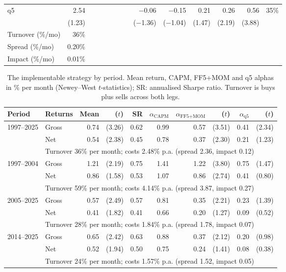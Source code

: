 \documentclass[12pt,a4paper]{article}
\begin{document}
\begin{singlespace}
\begin{table}[!htbp]
\begin{tabular}{lrrrrrrrrrrrrr}
q5 & 2.54 &  &  &  &  &  &  & \ensuremath{-}0.06 & \ensuremath{-}0.15 & 0.21 & 0.26 & 0.56 & 35\%\\
 & (1.23) &  &  &  &  &  &  & (\ensuremath{-}1.36) & (\ensuremath{-}1.04) & (1.47) & (2.19) & (3.88) & \\
\midrule
Turnover (\%/mo) & 36\% & \multicolumn{12}{l}{}\\
Spread (\%/mo) & 0.20\% & \multicolumn{12}{l}{}\\
Impact (\%/mo) & 0.01\% & \multicolumn{12}{l}{}\\
\bottomrule\end{tabular}
\end{table}

\begin{table}[!htbp]\centering
\caption{The implementable strategy by period. Mean return, CAPM, FF5+MOM and q5 alphas in \% per month (Newey--West $t$-statistics); SR: annualised Sharpe ratio. Turnover is buys plus sells across both legs.}\label{tab:main}
\footnotesize
\begin{tabular}{llrrrrrrrr}\toprule
Period & Returns & Mean & ($t$) & SR & $\alpha_{\text{CAPM}}$ & $\alpha_{\text{FF5+MOM}}$ & ($t$) & $\alpha_{\text{q5}}$ & ($t$)\\\midrule
1997--2025 & Gross & 0.74 & (3.26) & 0.62 & 0.99 & 0.57 & (3.51) & 0.41 & (2.34)\\
 & Net & 0.54 & (2.38) & 0.45 & 0.78 & 0.37 & (2.30) & 0.21 & (1.23)\\
 & \multicolumn{9}{l}{\footnotesize Turnover 36\% per month; costs 2.48\% p.a. (spread 2.36, impact 0.12)}\\[2pt]
1997--2004 & Gross & 1.21 & (2.19) & 0.75 & 1.41 & 1.22 & (3.80) & 0.75 & (1.47)\\
 & Net & 0.86 & (1.58) & 0.53 & 1.07 & 0.86 & (2.74) & 0.41 & (0.80)\\
 & \multicolumn{9}{l}{\footnotesize Turnover 59\% per month; costs 4.14\% p.a. (spread 3.87, impact 0.27)}\\[2pt]
2005--2025 & Gross & 0.57 & (2.49) & 0.57 & 0.81 & 0.35 & (2.21) & 0.23 & (1.39)\\
 & Net & 0.41 & (1.82) & 0.41 & 0.66 & 0.20 & (1.27) & 0.09 & (0.52)\\
 & \multicolumn{9}{l}{\footnotesize Turnover 28\% per month; costs 1.84\% p.a. (spread 1.78, impact 0.07)}\\[2pt]
2014--2025 & Gross & 0.65 & (2.42) & 0.63 & 0.88 & 0.37 & (2.12) & 0.20 & (0.98)\\
 & Net & 0.52 & (1.94) & 0.50 & 0.75 & 0.24 & (1.41) & 0.08 & (0.38)\\
 & \multicolumn{9}{l}{\footnotesize Turnover 24\% per month; costs 1.57\% p.a. (spread 1.52, impact 0.05)}\\[2pt]
\bottomrule\end{tabular}
\end{table}


\end{singlespace}
\end{document}
